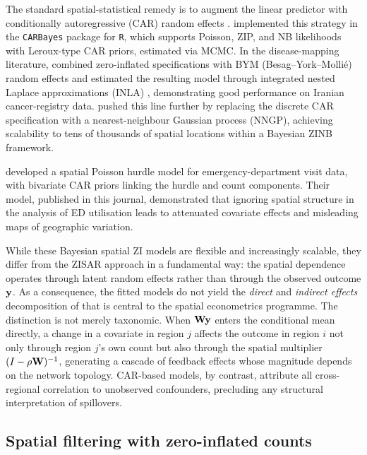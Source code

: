 The standard spatial-statistical remedy is to augment the linear predictor with conditionally autoregressive (CAR) random effects \citep{besag_york_mollie1991}.
\citet{lee2013} implemented this strategy in the \texttt{CARBayes} package for \texttt{R}, which supports Poisson, ZIP, and NB likelihoods with Leroux-type CAR priors, estimated via MCMC.
In the disease-mapping literature, \citet{asmarian2019} combined zero-inflated specifications with BYM (Besag--York--Molli\'{e}) random effects and estimated the resulting model through integrated nested Laplace approximations (INLA) \citep{rue_martino_chopin2009}, demonstrating good performance on Iranian cancer-registry data.
\citet{he2024} pushed this line further by replacing the discrete CAR specification with a nearest-neighbour Gaussian process (NNGP), achieving scalability to tens of thousands of spatial locations within a Bayesian ZINB framework.

\citet{neelon2013} developed a spatial Poisson hurdle model for emergency-department visit data, with bivariate CAR priors linking the hurdle and count components.
Their model, published in this journal, demonstrated that ignoring spatial structure in the analysis of ED utilisation leads to attenuated covariate effects and misleading maps of geographic variation.

While these Bayesian spatial ZI models are flexible and increasingly scalable, they differ from the ZISAR approach in a fundamental way: the spatial dependence operates through latent random effects rather than through the observed outcome $\mathbf{y}$.
As a consequence, the fitted models do not yield the \emph{direct} and \emph{indirect effects} decomposition of \citet{lesage_pace2009} that is central to the spatial econometrics programme.
The distinction is not merely taxonomic.
When $\mathbf{W}\mathbf{y}$ enters the conditional mean directly, a change in a covariate in region $j$ affects the outcome in region $i$ not only through region $j$'s own count but also through the spatial multiplier $(I - \rho\mathbf{W})^{-1}$, generating a cascade of feedback effects whose magnitude depends on the network topology.
CAR-based models, by contrast, attribute all cross-regional correlation to unobserved confounders, precluding any structural interpretation of spillovers.

\subsection{Spatial filtering with zero-inflated counts}\label{sec:lit_esf}


